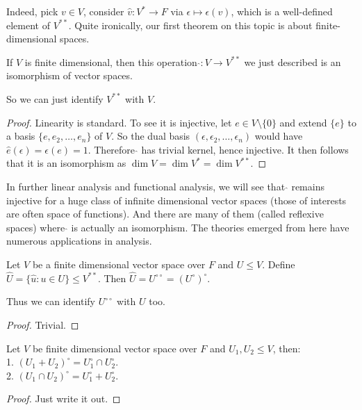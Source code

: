 Indeed, pick $v\in V$, consider $\hat{v}:V^\ast\to F$ via $\epsilon\mapsto\epsilon(v)$, which is a well-defined element of $V^{\ast\ast}$.
Quite ironically, our first theorem on this topic is about finite-dimensional spaces.
\begin{theorem}
    If $V$ is finite dimensional, then this operation $\hat{}:V\to V^{\ast\ast}$ we just described is an isomorphism of vector spaces.
\end{theorem}
So we can just identify $V^{\ast\ast}$ with $V$.
\begin{proof}
    Linearity is standard.
    To see it is injective, let $e\in V\setminus\{0\}$ and extend $\{e\}$ to a basis $\{e,e_2,\ldots,e_n\}$ of $V$.
    So the dual basis $(\epsilon,\epsilon_2,\ldots,\epsilon_n)$ would have $\hat{e}(\epsilon)=\epsilon(e)=1$.
    Therefore $\hat{}$ has trivial kernel, hence injective.
    It then follows that it is an isomorphism as $\dim V=\dim V^\ast=\dim V^{\ast\ast}$.
\end{proof}
\begin{remark}
    In further linear analysis and functional analysis, we will see that $\hat{}$ remains injective for a huge class of infinite dimensional vector spaces (those of interests are often space of functions).
    And there are many of them (called reflexive spaces) where $\hat{}$ is actually an isomorphism.
    The theories emerged from here have numerous applications in analysis.
\end{remark}
\begin{lemma}
    Let $V$ be a finite dimensional vector space over $F$ and $U\le V$.
    Define $\hat{U}=\{\hat{u}:u\in U\}\le V^{\ast\ast}$.
    Then $\hat{U}=U^{\circ\circ}=(U^\circ)^\circ$.
\end{lemma}
Thus we can identify $U^{\circ\circ}$ with $U$ too.
\begin{proof}
    Trivial.
\end{proof}
\begin{lemma}
    Let $V$ be finite dimensional vector space over $F$ and $U_1,U_2\le V$, then:\\
    1. $(U_1+U_2)^\circ=U_1^\circ\cap U_2^\circ$.\\
    2. $(U_1\cap U_2)^\circ=U_1^\circ+U_2^\circ$.
\end{lemma}
\begin{proof}
    Just write it out.
\end{proof}